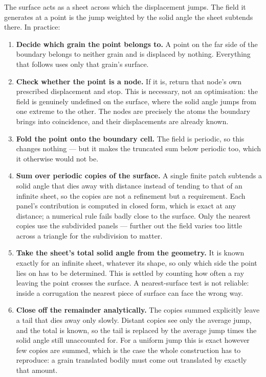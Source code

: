 \documentclass[11pt]{article}
\begin{document}
The surface acts as a sheet across which the displacement jumps. The field it
generates at a point is the jump weighted by the solid angle the sheet subtends
there. In practice:

\begin{enumerate}
  \item \textbf{Decide which grain the point belongs to.} A point on the far side
        of the boundary belongs to neither grain and is displaced by nothing.
        Everything that follows uses only that grain's surface.
  \item \textbf{Check whether the point is a node.} If it is, return that node's
        own prescribed displacement and stop. This is necessary, not an
        optimisation: the field is genuinely undefined on the surface, where the
        solid angle jumps from one extreme to the other. The nodes are precisely
        the atoms the boundary brings into coincidence, and their displacements
        are already known.
  \item \textbf{Fold the point onto the boundary cell.} The field is periodic, so
        this changes nothing --- but it makes the truncated sum below periodic
        too, which it otherwise would not be.
  \item \textbf{Sum over periodic copies of the surface.} A single finite patch
        subtends a solid angle that dies away with distance instead of tending to
        that of an infinite sheet, so the copies are not a refinement but a
        requirement. Each panel's contribution is computed in closed form, which
        is exact at any distance; a numerical rule fails badly close to the
        surface. Only the nearest copies use the subdivided panels --- further
        out the field varies too little across a triangle for the subdivision to
        matter.
  \item \textbf{Take the sheet's total solid angle from the geometry.} It is
        known exactly for an infinite sheet, whatever its shape, so only which
        side the point lies on has to be determined. This is settled by counting
        how often a ray leaving the point crosses the surface. A
        nearest-surface test is not reliable: inside a corrugation the nearest
        piece of surface can face the wrong way.
  \item \textbf{Close off the remainder analytically.} The copies summed
        explicitly leave a tail that dies away only slowly. Distant copies see
        only the average jump, and the total is known, so the tail is replaced by
        the average jump times the solid angle still unaccounted for. For a
        uniform jump this is exact however few copies are summed, which is the
        case the whole construction has to reproduce: a grain translated bodily
        must come out translated by exactly that amount.
\end{enumerate}
\end{document}
